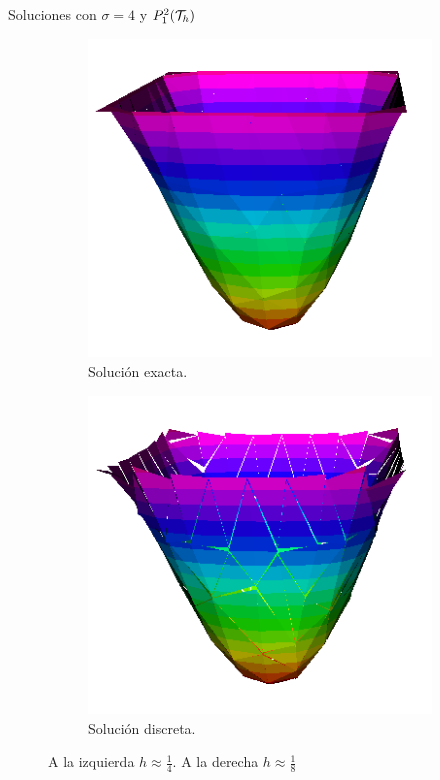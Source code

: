 \begin{frame}{Soluciones con $\sigma=4$ y $\relax{P}^2_1(\mathcal{T}_h)$}
\begin{figure}[h!]
\begin{subfigure}[b]{0.11\textwidth}
			\end{subfigure}
			\begin{subfigure}[b]{0.215\textwidth}
				\centering
				\includegraphics[scale=0.16]{img/Difusion/Recortes/steady_diffusion_exact_n_8.png}
				\caption{Solución exacta.}
			\end{subfigure}
			\begin{subfigure}[b]{0.215\textwidth}
				\centering
				\includegraphics[scale=0.16]{img/Difusion/Recortes/steady_diffusion_approx_n_8.png}
				\caption{Solución discreta.}
			\end{subfigure}
			\caption{A la izquierda $h\approx\frac{1}{4}$. A la derecha $h\approx\frac{1}{8}$}
		\end{figure}
		\begin{figure}[h!]
			\begin{subfigure}[b]{0.215\textwidth}
				\centering

\end{subfigure}
\end{figure}
\end{frame}
